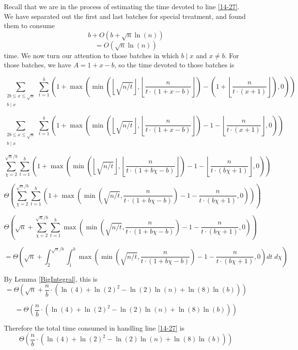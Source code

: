 \documentclass[12pt]{article}
\newcommand{\eqn}[1]{\begin{displaymath} #1 \end{displaymath}}
\newcommand{\neqn}[1]{\begin{equation} #1 \end{equation}}
\newcommand{\floor}[1]{{\left\lfloor #1 \right\rfloor}}
\newcommand{\floordiv}[2]{\floor{\frac{#1}{#2}}}
\newcommand{\isqrt}[1]{\floor{\sqrt{#1}}}
\begin{document}
Recall that we are in the process of estimating the time devoted to line \ref{14-27}.  We have separated out the first and last batches for special treatment, and found them to consume
\eqn{b + O(b + \sqrt{n} \ln(n))}
\eqn{= O(\sqrt{n} \ln(n))}
time.  We now turn our attention to those batches in which $b \mid x$ and $x \neq b$.  For those batches, we have $A = 1 + x - b$, so the time devoted to those batches is

\eqn{\sum_{\substack{2b \leq x \leq \sqrt{n} \\ b \mid x}}\sum_{t=1}^b \left( 1 + \max\left( \min \left( \isqrt{n/t} , \floordiv{n}{t \cdot (1 + x - b)} \right)
-
\left( 1 + \floordiv{n}{t \cdot (x+1)} \right)
, 0 \right) \right)}

\eqn{\sum_{\substack{2b \leq x \leq \sqrt{n} \\ b \mid x}}\sum_{t=1}^b \left( 1 + \max\left( \min \left( \isqrt{n/t} , \floordiv{n}{t \cdot (1 + x - b)} \right)
- 1
- \floordiv{n}{t \cdot (x+1)}
, 0 \right) \right)}

\eqn{\sum_{\chi=2}^{\sqrt{n}/b} \sum_{t=1}^b \left( 1 + \max\left( \min \left( \isqrt{n/t} , \floordiv{n}{t \cdot (1 + b\chi - b)} \right)
- 1
- \floordiv{n}{t \cdot (b\chi + 1)}
, 0 \right) \right)}

\eqn{\Theta \left( \sum_{\chi=2}^{\sqrt{n}/b} \sum_{t=1}^b \left( 1 + \max\left( \min \left( \sqrt{n/t} , \frac{n}{t \cdot (1 + b\chi - b)} \right)
- 1
- \frac{n}{t \cdot (b\chi + 1)}
, 0 \right) \right)
\right)}

\eqn{\Theta \left( \sqrt{n} + \sum_{\chi=2}^{\sqrt{n}/b} \sum_{t=1}^b \max\left( \min \left( \sqrt{n/t} , \frac{n}{t \cdot (1 + b\chi - b)} \right)
- 1
- \frac{n}{t \cdot (b\chi + 1)}
, 0 \right)
\right)}

\eqn{= \Theta \left( \sqrt{n} + \int_2^{\sqrt{n}/b} \int_1^b
\max\left( \min \left( \sqrt{n/t} , \frac{n}{t \cdot (1 + b\chi - b)} \right)
- 1
- \frac{n}{t \cdot (b\chi + 1)}
, 0 \right) dt \; d\chi
\right)}

By Lemma \ref{BigIntegral}, this is
\eqn{= \Theta \left( \sqrt{n} + \frac{n}{b} \cdot \left( \ln(4) + \ln(2)^2 - \ln(2) \ln(n) + \ln(8)\ln(b) \right)\right)}

\eqn{= \Theta \left( \frac{n}{b} \cdot \left( \ln(4) + \ln(2)^2 - \ln(2) \ln(n) + \ln(8)\ln(b) \right)\right)}

Therefore the total time consumed in handling line \ref{14-27} is
\neqn{\Theta \left( \frac{n}{b} \cdot \left( \ln(4) + \ln(2)^2 - \ln(2) \ln(n) + \ln(8)\ln(b) \right)\right) \label{14-27-time}}
\end{document}
